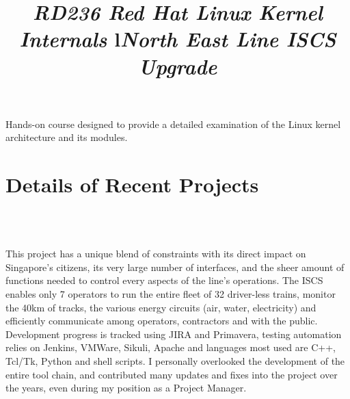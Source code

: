 \documentclass[overlapped,line,letterpaper]{res}
\begin{document}
\begin{resume}


  \newpage

  \title{\em{RD236 Red Hat Linux Kernel Internals} }
  \begin{position}
    Hands-on course designed to provide a detailed examination of the
    Linux kernel architecture and its modules.
  \end{position}



  \section{\bf Details of Recent Projects}

  \begin{format}
    \title{l}\\
    \body\\
  \end{format}

  \title{\em North East Line ISCS Upgrade}
  \begin{position}
    This project has a unique blend of constraints with its direct impact on
    Singapore's citizens, its very large number of interfaces, and the sheer
    amount of functions needed to control every aspects of the line's
    operations. The ISCS enables only 7 operators to run the entire fleet of 32
    driver-less trains, monitor the 40km of tracks, the various energy circuits
    (air, water, electricity) and efficiently communicate among operators,
    contractors and with the public. Development progress is tracked using JIRA
    and Primavera, testing automation relies on Jenkins, VMWare, Sikuli, Apache
    and languages most used are C++, Tcl/Tk, Python and shell scripts. I
    personally overlooked the development of the entire tool chain, and
    contributed many updates and fixes into the project over the years, even
    during my position as a Project Manager.
  \end{position}


\end{resume}
\end{document}
